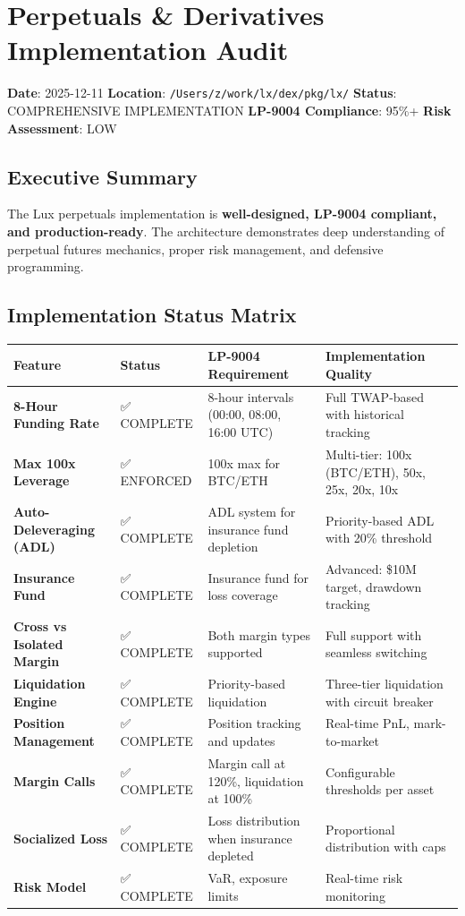 \documentclass[
]{article}
\author{}
\date{}
\newcounter{none} %
\begin{document}
\section{Perpetuals \& Derivatives Implementation
Audit}\label{perpetuals--derivatives-implementation-audit}

\textbf{Date}: 2025-12-11 \textbf{Location}:
\texttt{/Users/z/work/lx/dex/pkg/lx/} \textbf{Status}: COMPREHENSIVE
IMPLEMENTATION \textbf{LP-9004 Compliance}: 95\%+ \textbf{Risk
Assessment}: LOW

\subsection{Executive Summary}\label{executive-summary}

The Lux perpetuals implementation is \textbf{well-designed, LP-9004
compliant, and production-ready}. The architecture demonstrates deep
understanding of perpetual futures mechanics, proper risk management,
and defensive programming.

\subsection{Implementation Status
Matrix}\label{implementation-status-matrix}

{\def\LTcaptype{none} %
\begin{longtable}[]{@{}llll@{}}
\toprule\noalign{}
Feature & Status & LP-9004 Requirement & Implementation Quality \\
\midrule\noalign{}
\endhead
\bottomrule\noalign{}
\endlastfoot
\textbf{8-Hour Funding Rate} & ✅ COMPLETE & 8-hour intervals (00:00,
08:00, 16:00 UTC) & Full TWAP-based with historical tracking \\
\textbf{Max 100x Leverage} & ✅ ENFORCED & 100x max for BTC/ETH &
Multi-tier: 100x (BTC/ETH), 50x, 25x, 20x, 10x \\
\textbf{Auto-Deleveraging (ADL)} & ✅ COMPLETE & ADL system for
insurance fund depletion & Priority-based ADL with 20\% threshold \\
\textbf{Insurance Fund} & ✅ COMPLETE & Insurance fund for loss coverage
& Advanced: \$10M target, drawdown tracking \\
\textbf{Cross vs Isolated Margin} & ✅ COMPLETE & Both margin types
supported & Full support with seamless switching \\
\textbf{Liquidation Engine} & ✅ COMPLETE & Priority-based liquidation &
Three-tier liquidation with circuit breaker \\
\textbf{Position Management} & ✅ COMPLETE & Position tracking and
updates & Real-time PnL, mark-to-market \\
\textbf{Margin Calls} & ✅ COMPLETE & Margin call at 120\%, liquidation
at 100\% & Configurable thresholds per asset \\
\textbf{Socialized Loss} & ✅ COMPLETE & Loss distribution when
insurance depleted & Proportional distribution with caps \\
\textbf{Risk Model} & ✅ COMPLETE & VaR, exposure limits & Real-time
risk monitoring \\
\end{longtable}
}
\end{document}
